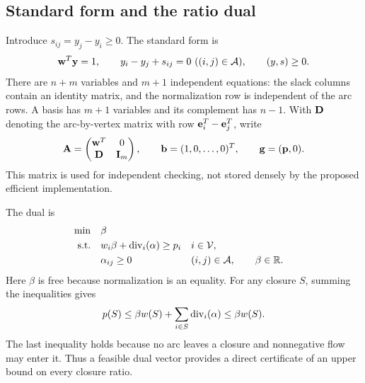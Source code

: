 \subsection{Standard form and the ratio dual}
Introduce $s_{ij}=y_j-y_i\ge0$. The standard form is
\begin{equation}\label{eq:standard}
 \mathbf{w}^T\mathbf{y}=1,\qquad y_i-y_j+s_{ij}=0\ ((i,j)\in\mathcal A),
 \qquad(y,s)\ge0.
\end{equation}
There are $n+m$ variables and $m+1$ independent equations: the slack
columns contain an identity matrix, and the normalization row is independent
of the arc rows. A basis has $m+1$ variables and its complement has $n-1$.
With $\mathbf{D}$ denoting the arc-by-vertex matrix with row $\mathbf{e}_i^T-\mathbf{e}_j^T$, write
\begin{equation}\label{eq:standardmatrix}
 \mathbf{A}=\begin{pmatrix}\mathbf{w}^T&0\\\mathbf{D}&\mathbf{I}_m\end{pmatrix},\qquad
 \mathbf{b}=(1,0,\ldots,0)^T,\qquad \mathbf{g}=(\mathbf{p},0).
\end{equation}
This matrix is used for independent checking, not stored densely by the
proposed efficient implementation.

The dual is
\begin{equation}\label{eq:ratio-dual}
\begin{aligned}
\min\quad &\beta\\
\text{s.t.}\quad &w_i\beta+\operatorname{div}_i(\alpha)\ge p_i &&i\in\mathcal V,\\
&\alpha_{ij}\ge0 &&(i,j)\in\mathcal A,\qquad \beta\in\mathbb R.
\end{aligned}
\end{equation}
Here $\beta$ is free because normalization is an equality. For any closure
$S$, summing the inequalities gives
\[
 p(S)\le\beta w(S)+\sum_{i\in S}\operatorname{div}_i(\alpha)\le\beta w(S).
\]
The last inequality holds because no arc leaves a closure and nonnegative
flow may enter it. Thus a feasible dual vector provides a direct certificate
of an upper bound on every closure ratio.
